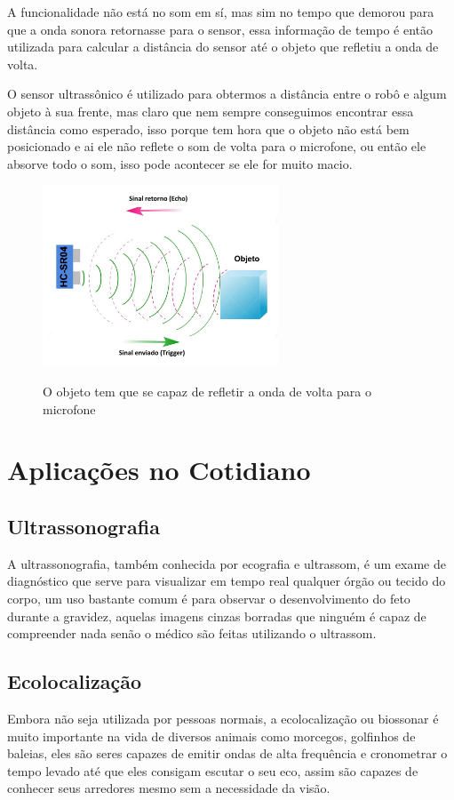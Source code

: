     A funcionalidade não está no som em sí, mas sim no tempo que demorou para que a onda sonora retornasse para o sensor, essa informação de tempo é então utilizada para calcular a distância do sensor até o objeto que refletiu a onda de volta.
    
    O sensor ultrassônico é utilizado para obtermos a distância entre o robô e algum objeto à sua frente, mas claro que nem sempre conseguimos encontrar essa distância como esperado, isso porque tem hora que o objeto não está bem posicionado e ai ele não reflete o som de volta para o microfone, ou então ele absorve todo o som, isso pode acontecer se ele for muito macio.
    
    \begin{figure}[h]
    \caption{O objeto tem que se capaz de refletir a onda de volta para o microfone}
     
    \centering 
    \includegraphics[width=7cm]{Figuras/onda.jpg}
    \label{figura:onda.jpeg}
    \end{figure}
    
\section{Aplicações no Cotidiano}

    \subsection*{Ultrassonografia}
        A ultrassonografia, também conhecida por ecografia e ultrassom, é um exame de diagnóstico que serve para visualizar em tempo real qualquer órgão ou tecido do corpo, um uso bastante comum é para observar o desenvolvimento do feto durante a gravidez, aquelas imagens cinzas borradas que ninguém é capaz de compreender nada senão o médico são feitas utilizando o ultrassom.
        
    \subsection*{Ecolocalização}
        Embora não seja utilizada por pessoas normais, a ecolocalização ou biossonar é muito importante na vida de diversos animais como morcegos, golfinhos de baleias, eles são seres capazes de emitir ondas de alta frequência e cronometrar o tempo levado até que eles consigam escutar o seu eco, assim são capazes de conhecer seus arredores mesmo sem a necessidade da visão.
        
